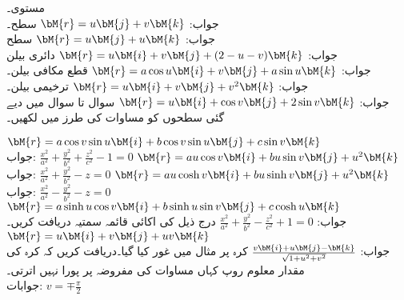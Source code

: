 \quad {} مستوی۔\\
جواب:\quad
$\bM{r}=u\bM{j}+v\bM{k}$
\quad {} سطح۔\\
جواب:\quad
$\bM{r}=u\bM{j}+u\bM{k}$
\quad سطح \\
جواب:\quad 
$\bM{r}=u\bM{i}+v\bM{j}+(2-u-v)\bM{k}$
\quad دائری بیلن \\
جواب:\quad
$\bM{r}=a\cos u\bM{i}+v\bM{j}+a\sin u\bM{k}$
\quad {} قطع مکافی بیلن۔\\
جواب:\quad
$\bM{r}=u\bM{i}+v\bM{j}+v^2\bM{k}$
\quad {} ترخیمی بیلن۔\\
جواب:\quad
$\bM{r}=u\bM{i}+\cos v\bM{j}+2\sin v\bM{k}$
سوال  تا سوال   میں دیے گئی سطحوں کو مساوات  کی طرز میں لکھیں۔

\quad
$\bM{r}=a\cos v\sin u\bM{i}+b\cos v\sin u\bM{j}+c\sin v\bM{k}$\\
جواب:\quad
$\tfrac{x^2}{a^2}+\tfrac{y^2}{b^2}+\tfrac{z^2}{c^2}-1=0$
\quad
$\bM{r}=au\cos v\bM{i}+bu\sin v\bM{j}+u^2\bM{k}$\\
جواب:\quad
$\tfrac{x^2}{a^2}+\tfrac{y^2}{b^2}-z=0$
\quad
$\bM{r}=au\cosh v\bM{i}+bu\sinh v\bM{j}+u^2\bM{k}$\\
جواب:\quad
$\tfrac{x^2}{a^2}-\tfrac{y^2}{b^2}-z=0$
\quad
$\bM{r}=a\sinh u\cos v\bM{i}+b\sinh u\sin v\bM{j}+c\cosh u\bM{k}$\\
جواب:\quad
$\tfrac{x^2}{a^2}+\tfrac{y^2}{b^2}-\tfrac{z^2}{c^2}+1=0$
\quad درج ذیل کی اکائی قائمہ سمتیہ دریافت کریں۔
$\bM{r}=u\bM{i}+v\bM{j}+uv\bM{k}$\\
جواب:\quad
$\tfrac{v\bM{i}+u\bM{j}-\bM{k}}{\sqrt{1+u^2+v^2}}$
\quad کرہ پر مثال  میں غور کیا گیا۔دریافت کریں کہ کرہ کی مقدار معلوم روپ کہاں مساوات  کی مفروضہ پر پورا نہیں اترتی۔\\
جوابات:\quad
$v=\mp \tfrac{\pi}{2}$

